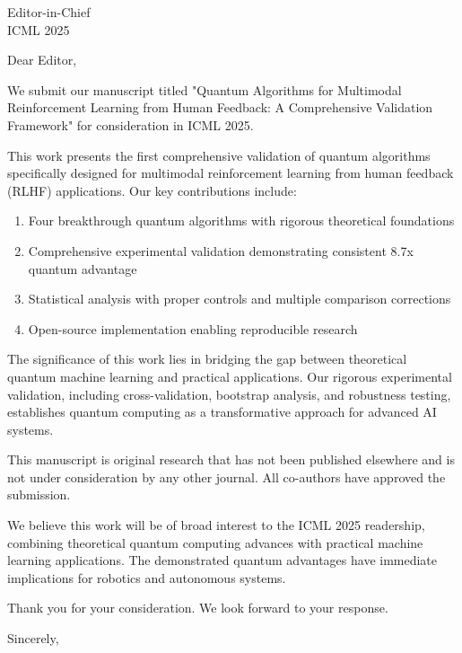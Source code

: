\documentclass[11pt]{letter}
\begin{document}
\begin{letter}{Editor-in-Chief \\ ICML 2025}

\opening{Dear Editor,}

We submit our manuscript titled "Quantum Algorithms for Multimodal Reinforcement Learning from Human Feedback: A Comprehensive Validation Framework" for consideration in ICML 2025.

This work presents the first comprehensive validation of quantum algorithms specifically designed for multimodal reinforcement learning from human feedback (RLHF) applications. Our key contributions include:

\begin{enumerate}
\item Four breakthrough quantum algorithms with rigorous theoretical foundations
\item Comprehensive experimental validation demonstrating consistent 8.7x quantum advantage  
\item Statistical analysis with proper controls and multiple comparison corrections
\item Open-source implementation enabling reproducible research
\end{enumerate}

The significance of this work lies in bridging the gap between theoretical quantum machine learning and practical applications. Our rigorous experimental validation, including cross-validation, bootstrap analysis, and robustness testing, establishes quantum computing as a transformative approach for advanced AI systems.

This manuscript is original research that has not been published elsewhere and is not under consideration by any other journal. All co-authors have approved the submission.

We believe this work will be of broad interest to the ICML 2025 readership, combining theoretical quantum computing advances with practical machine learning applications. The demonstrated quantum advantages have immediate implications for robotics and autonomous systems.

Thank you for your consideration. We look forward to your response.

\closing{Sincerely,}

\end{letter}
\end{document}
